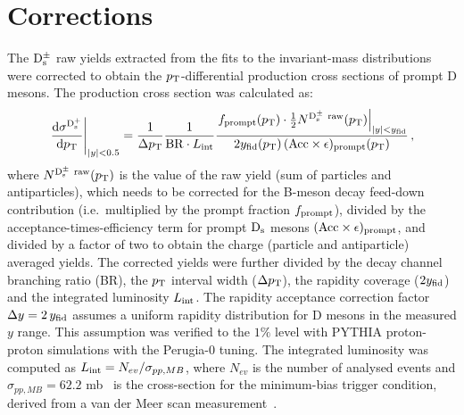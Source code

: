 \section{Corrections}

The ${\rm D_s^{\pm}}$ raw yields extracted from the fits to the invariant-mass distributions
were corrected to obtain the $p_{\rm T}$-differential production cross sections of prompt
 D mesons. The production cross section was calculated as:
\begin{equation}
  \label{eq:dsdpt}
  \left.\frac{{\rm d} \sigma^{\rm D^{+}_{\rm s}}}{{\rm d}p_{\rm T}}\right|_{|y|<0.5}=
  \frac{1}{ \Delta p_{\rm T}}\frac{1}{{\rm BR} \cdot L_{\rm int}}\frac{\left.f_{\rm prompt}(p_{\rm T})\cdot \frac{1}{2} N^{\rm D^\pm_{\rm s}~raw}(p_{\rm T})\right|_{|y|<y_{\rm fid}}}{ 2 y_{\rm fid}(p_{\rm T}) \,({\rm Acc}\times\epsilon)_{\rm prompt}(p_{\rm T})}\,,
\end{equation}
where $N^{\rm D^\pm_{\rm s}~raw}(p_{\rm T})$ is the value of the raw yield 
(sum of particles and antiparticles),
 which needs to be corrected for the B-meson decay feed-down contribution 
(i.e.\ multiplied by the prompt fraction $f_{\rm{prompt}}$), divided by the 
acceptance-times-efficiency term for prompt ${\rm D_s}$ mesons 
$(\rm Acc \times \epsilon)_{\rm{prompt}}$, and divided by a factor of two to 
obtain the charge (particle and antiparticle) averaged yields.
The corrected yields were further divided by the decay channel branching ratio (BR), 
the $p_{\rm T}$ interval width ($\Delta p_{\rm T}$), the rapidity coverage 
($2 y_{\rm fid}$) and the integrated luminosity $L_{\rm int}$.
The rapidity acceptance correction factor $\Delta y=2\,y_{\rm fid}$ assumes
a uniform rapidity  distribution for D mesons in the measured $y$ range.
This assumption was verified to the $1\%$ level with PYTHIA proton-proton simulations 
with the Perugia-0 tuning.
The integrated luminosity was computed as $L_{\rm int} = N_{ev}/\sigma_{pp,MB}$,
where $N_{ev}$ is the number of analysed events and 
$\sigma_{pp,MB} = 62.2$ mb~\cite{Abelev:2012sea}
is the cross-section for the minimum-bias trigger condition, derived from
a van der Meer scan measurement~\cite{vanderMeer:296752}.

